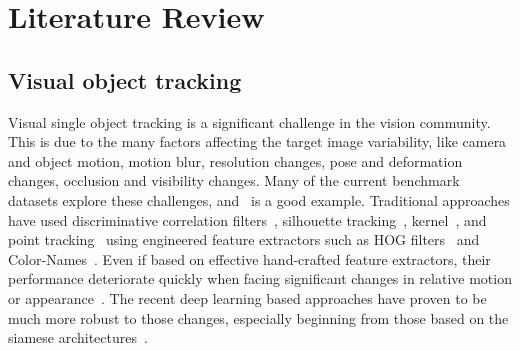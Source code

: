 \chapter{Literature Review} %

\label{Chapter2} %

\section{Visual object tracking}
Visual single object tracking is a significant challenge in the vision community. This is due to the many factors affecting the target image variability, like camera and object motion, motion blur, resolution changes, pose and deformation changes, occlusion and visibility changes. Many of the current benchmark datasets explore these challenges, and~\cite{noman2022avist} is a good example. Traditional approaches have used discriminative correlation filters~\cite{henriques2014high, ding2017real, marvasti2019rotation, marvasti2021adaptive, marvasti2021efficient}, silhouette tracking~\cite{xiao2016efficient}, kernel~\cite{bruni2014improvement}, and point tracking~\cite{lychkov2018tracking} using engineered feature extractors such as HOG filters~\cite{dalal2005histograms} and Color-Names~\cite{van2007learning}. Even if based on effective hand-crafted feature extractors, their performance deteriorate quickly when facing significant changes in relative motion or appearance~\cite{marvasti2021deep}. The recent deep learning based approaches have proven to be much more robust to those changes, especially beginning from those based on the siamese architectures~\cite{koch2015siamese,melekhov2016siamese}. 

